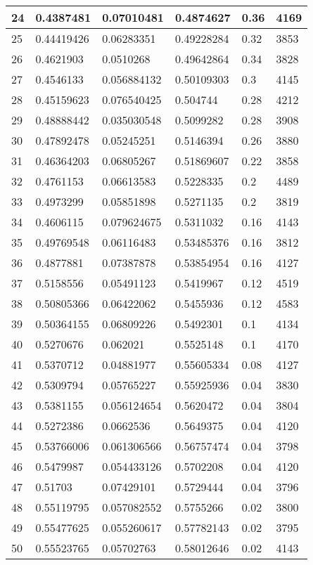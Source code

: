 \begin{longtable}{|l|l|l|l|l|l|}
24 & 0.4387481 & 0.07010481 & 0.4874627 & 0.36 & 4169 \\ \hline 
25 & 0.44419426 & 0.06283351 & 0.49228284 & 0.32 & 3853 \\ \hline 
26 & 0.4621903 & 0.0510268 & 0.49642864 & 0.34 & 3828 \\ \hline 
27 & 0.4546133 & 0.056884132 & 0.50109303 & 0.3 & 4145 \\ \hline 
28 & 0.45159623 & 0.076540425 & 0.504744 & 0.28 & 4212 \\ \hline 
29 & 0.48888442 & 0.035030548 & 0.5099282 & 0.28 & 3908 \\ \hline 
30 & 0.47892478 & 0.05245251 & 0.5146394 & 0.26 & 3880 \\ \hline 
31 & 0.46364203 & 0.06805267 & 0.51869607 & 0.22 & 3858 \\ \hline 
32 & 0.4761153 & 0.06613583 & 0.5228335 & 0.2 & 4489 \\ \hline 
33 & 0.4973299 & 0.05851898 & 0.5271135 & 0.2 & 3819 \\ \hline 
34 & 0.4606115 & 0.079624675 & 0.5311032 & 0.16 & 4143 \\ \hline 
35 & 0.49769548 & 0.06116483 & 0.53485376 & 0.16 & 3812 \\ \hline 
36 & 0.4877881 & 0.07387878 & 0.53854954 & 0.16 & 4127 \\ \hline 
37 & 0.5158556 & 0.05491123 & 0.5419967 & 0.12 & 4519 \\ \hline 
38 & 0.50805366 & 0.06422062 & 0.5455936 & 0.12 & 4583 \\ \hline 
39 & 0.50364155 & 0.06809226 & 0.5492301 & 0.1 & 4134 \\ \hline 
40 & 0.5270676 & 0.062021 & 0.5525148 & 0.1 & 4170 \\ \hline 
41 & 0.5370712 & 0.04881977 & 0.55605334 & 0.08 & 4127 \\ \hline 
42 & 0.5309794 & 0.05765227 & 0.55925936 & 0.04 & 3830 \\ \hline 
43 & 0.5381155 & 0.056124654 & 0.5620472 & 0.04 & 3804 \\ \hline 
44 & 0.5272386 & 0.0662536 & 0.5649375 & 0.04 & 4120 \\ \hline 
45 & 0.53766006 & 0.061306566 & 0.56757474 & 0.04 & 3798 \\ \hline 
46 & 0.5479987 & 0.054433126 & 0.5702208 & 0.04 & 4120 \\ \hline 
47 & 0.51703 & 0.07429101 & 0.5729444 & 0.04 & 3796 \\ \hline 
48 & 0.55119795 & 0.057082552 & 0.5755266 & 0.02 & 3800 \\ \hline 
49 & 0.55477625 & 0.055260617 & 0.57782143 & 0.02 & 3795 \\ \hline 
50 & 0.55523765 & 0.05702763 & 0.58012646 & 0.02 & 4143 \\ \hline 
\end{longtable}